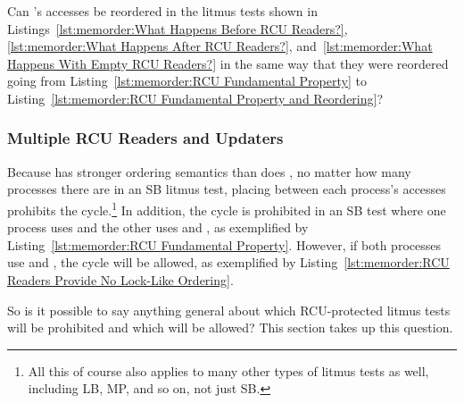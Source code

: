 \QuickQuiz{}
	Can 's accesses be reordered in the litmus tests shown in
	Listings~\ref{lst:memorder:What Happens Before RCU Readers?},
	\ref{lst:memorder:What Happens After RCU Readers?},
	and~\ref{lst:memorder:What Happens With Empty RCU Readers?}
	in the same way that they were reordered going from
	Listing~\ref{lst:memorder:RCU Fundamental Property}
	to
	Listing~\ref{lst:memorder:RCU Fundamental Property and Reordering}?
 \QuickQuizEnd

\subsubsection{Multiple RCU Readers and Updaters}
\label{sec:memorder:Multiple RCU Readers and Updaters}

Because  has stronger ordering semantics than does
, no matter how many processes there are in an SB
litmus test, placing  between each process's
accesses prohibits the cycle.\footnote{
	All this of course also applies to many other types of litmus tests
	as well, including LB, MP, and so on, not just SB.}
In addition, the cycle is prohibited in an SB test where one process
uses  and the other uses  and
, as exemplified by
Listing~\ref{lst:memorder:RCU Fundamental Property}.
However, if both processes use  and
, the cycle will be allowed, as exemplified by
Listing~\ref{lst:memorder:RCU Readers Provide No Lock-Like Ordering}.

So is it possible to say anything general about which RCU-protected
litmus tests will be prohibited and which will be allowed?
This section takes up this question.

